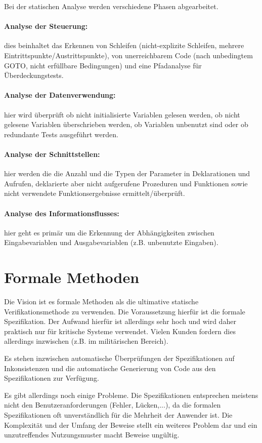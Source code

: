 Bei der statischen Analyse werden verschiedene Phasen abgearbeitet. 
\paragraph{Analyse der Steuerung:} dies beinhaltet das Erkennen von Schleifen (nicht-explizite Schleifen, mehrere Eintrittspunkte/Austrittspunkte), von unerreichbarem Code (nach unbedingtem GOTO, nicht erfüllbare Bedingungen) und eine Pfadanalyse für Überdeckungstests.

\paragraph{Analyse der Datenverwendung:} hier wird überprüft ob nicht initialisierte Variablen gelesen werden, ob nicht gelesene Variablen überschrieben werden, ob Variablen unbenutzt sind oder ob redundante Tests ausgeführt werden.

\paragraph{Analyse der Schnittstellen:} hier werden die die Anzahl und die Typen der Parameter in Deklarationen und Aufrufen, deklarierte aber nicht aufgerufene Prozeduren und Funktionen sowie nicht verwendete Funktionsergebnisse ermittelt/überprüft.

\paragraph{Analyse des Informationsflusses:} hier geht es primär um die Erkennung der Abhängigkeiten zwischen Eingabevariablen und Ausgabevariablen (z.B. unbenutzte Eingaben).

\section{Formale Methoden}
Die Vision ist es formale Methoden als die ultimative statische Verifikationsmethode zu verwenden.
Die Voraussetzung hierfür ist die formale Spezifikation. Der Aufwand hierfür ist allerdings sehr hoch und wird daher praktisch nur für kritische Systeme verwendet. Vielen Kunden fordern dies allerdings inzwischen (z.B. im militärischen Bereich). 

Es stehen inzwischen automatische Überprüfungen der Spezifikationen auf Inkonsistenzen und die automatische Generierung von Code aus den Spezifikationen zur Verfügung. 

Es gibt allerdings noch einige Probleme. Die Spezifikationen entsprechen meistens nicht den Benutzeranforderungen (Fehler, Lücken,...), da die formalen Spezifikationen oft unverständlich für die Mehrheit der Anwender ist. Die Komplexität und der Umfang der Beweise stellt ein weiteres Problem dar und ein unzutreffendes Nutzungsmuster macht Beweise ungültig.


